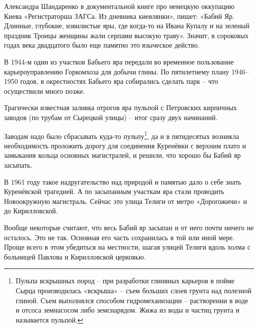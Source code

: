 Александра Шандаренко в документальной книге про немецкую оккупацию Киева «Регистраторша ЗАГСа. Из дневника киевлянки», пишет: «Бабий Яр. Длинные, глубокие, извилистые яры, где когда-то на Ивана Купалу и на зеленый праздник Троицы женщины жали серпами высокую траву». Значит, в сороковых годах века двадцатого было еще памятно это языческое действо.

В 1944-м один из участков Бабьего яра передали во временное пользование карьероуправлению Горкомхоза для добычи глины. По пятилетнему плану 1946–1950 годов, в окрестностях Бабьего яра собирались сделать парк – что осуществили много позже. 

Трагически известная заливка отрогов яра пульпой с Петровских кирпичных заводов (по трубам от Сырецкой улицы) – итог сразу двух начинаний.

Заводам надо было сбрасывать куда-то пульпу\footnote{Пульпа вскрышных пород – при разработки глиняных карьеров в пойме Сырца производилась «вскрыша» – съем больших слоев грунта над полезной глиной. Съем выполнялся способом гидромеханизации – растворении в воде и отсоса земнасосом либо земснарядом. Жижа из воды и частиц грунта и называется пульпой.}, да и  в пятидесятых возникла необходимость проложить дорогу для соединения Куренёвки с верхним плато и замыкания кольца основных магистралей, и решили, что хорошо бы Бабий яр засыпать.




В 1961 году такое надругательство над природой и памятью дало о себе знать Куренёвской трагедией. А по засыпанным участкам яра стали проводить Новоокружную магистраль. Сейчас это улица Телиги от метро «Дорогожичи» и до Кирилловской. 

Вообще некоторые считают, что весь Бабий яр засыпан и от него почти ничего не осталось. Это не так. Основная его часть сохранилась в той или иной мере. Проще всего в этом убедиться на местности, шагая улицей Телиги вдоль холма с больницей Павлова и Кирилловской церковью.


